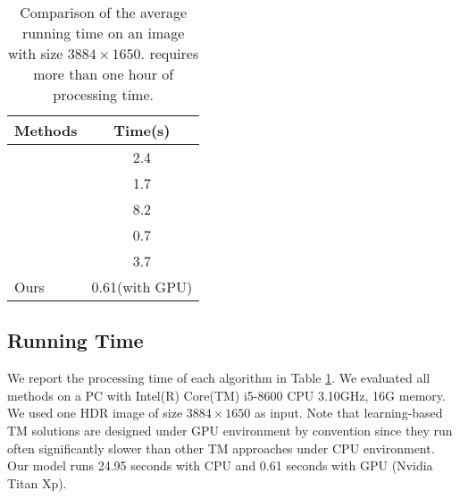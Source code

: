 \documentclass[journal]{IEEEtran}
\begin{document}
\begin{table}[tb]
\footnotesize
\begin{center}
\caption{Comparison of the average running time on an image with size $3884\times1650$. \cite{paris2015local} requires more than one hour of processing time.}
\begin{tabular}{l|c}
\hline
Methods & Time(s) \\ \hline
\cite{gu2013local} & 2.4 \\ \hline
\cite{mantiuk2008display} & 1.7 \\ \hline
\cite{ferradans2011analysis} & 8.2 \\ \hline
\cite{mai2011optimizing} & 0.7 \\ \hline
\cite{photomatrix} & 3.7 \\ \hline
Ours & 0.61(with GPU)  \\ \hline
\end{tabular}
\label{table:running_time}
\end{center}
\end{table}



\subsection{Running Time}
We report the processing time of each algorithm in Table \ref{table:running_time}. We evaluated all methods on a PC with Intel(R) Core(TM) i5-8600 CPU 3.10GHz, 16G memory.  We used one HDR image of size $3884\times1650$ as input.  Note that learning-based TM solutions are designed under GPU environment by convention since they run often significantly slower than other TM approaches under CPU environment.  Our model runs 24.95 seconds with CPU and 0.61 seconds with GPU (Nvidia Titan Xp).
\end{document}
